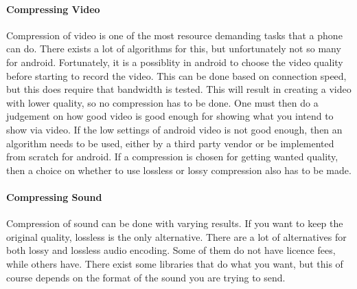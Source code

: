 \paragraph{Compressing Video}
Compression of video is one of the most resource demanding tasks that a phone can do. There exists a lot of algorithms for this, but unfortunately not so many for android. Fortunately, it is a possiblity in android to choose the video quality before starting to record the video. This can be done based on connection speed, but this does require that bandwidth is tested. This will result in creating a video with lower quality, so no compression has to be done. One must then do a judgement on how good video is good enough for showing what you intend to show via video. If the low settings of android video is not good enough, then an algorithm needs to be used, either by a third party vendor or be implemented from scratch for android. If a compression is chosen for getting wanted quality, then a choice on whether to use lossless or lossy compression also has to be made.

\paragraph{Compressing Sound}
Compression of sound can be done with varying results. If you want to keep the original quality, lossless is the only alternative. There are a lot of alternatives for both lossy and lossless audio encoding. Some of them do not have licence fees, while others have. There exist some libraries that do what you want, but this of course depends on the format of the sound you are trying to send.







